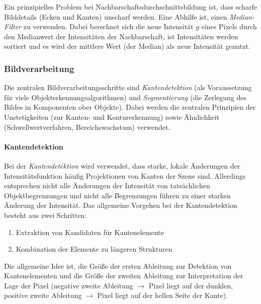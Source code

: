 					Ein prinzipielles Problem bei Nachbarschaftsdurchschnittsbildung ist, dass scharfe Bilddetails (\zB Ecken und Kanten) unscharf werden. Eine Abhilfe ist, einen \emph{Median-Filter} zu verwenden. Dabei berechnet sich die neue Intensität \(g\) eines Pixels durch den Medianwert der Intensitäten der Nachbarschaft, \dh ist Intensitäten werden sortiert und es wird der mittlere Wert (der Median) als neue Intensität genutzt.

			\subsubsection{Bildverarbeitung}
				Die zentralen Bildverarbeitungsschritte sind \emph{Kantendetektion} (als Voraussetzung für viele Objekterkennungsalgorithmen) und \emph{Segmentierung} (die Zerlegung des Bildes in Komponenten ober Objekte). Dabei werden die zentralen Prinzipien der Unstetigkeiten (zur Kanten- und Konturerkennung) sowie Ähnlichkeit (Schwellwertverfahren, Bereichswachstum) verwendet.

				\paragraph{Kantendetektion}
					Bei der \emph{Kantendetektion} wird verwendet, dass starke, lokale Änderungen der Intensitätsfunktion häufig Projektionen von Kanten der Szene sind. Allerdings entsprechen nicht alle Änderungen der Intensität von tatsächlichen Objektbegrenzungen und nicht alle Begrenzungen führen zu einer starken Änderung der Intensität. Das allgemeine Vorgehen bei der Kantendetektion besteht aus zwei Schritten:
					\begin{enumerate}
						\item Extraktion von Kandidaten für Kantenelemente
						\item Kombination der Elemente zu längeren Strukturen
					\end{enumerate}
				
					Die allgemeine Idee ist, die Größe der ersten Ableitung zur Detektion von Kantenelementen und die Größe der zweiten Ableitung zur Interpretation der Lage der Pixel (negative zweite Ableitung \(\to\) Pixel liegt auf der dunklen, positive zweite Ableitung \(\to\) Pixel liegt auf der hellen Seite der Kante).
					
